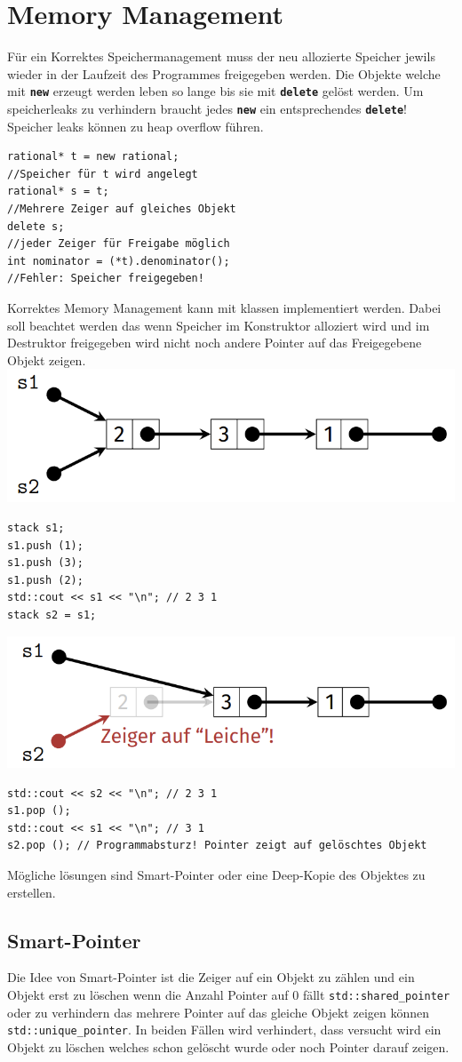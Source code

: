 \section{Memory Management}
Für ein Korrektes Speichermanagement muss der neu allozierte Speicher jewils wieder in der Laufzeit des Programmes freigegeben werden.
Die Objekte welche mit \textbf{\texttt{new}} erzeugt werden leben so lange bis sie mit \textbf{\texttt{delete}} gelöst werden.
Um speicherleaks zu verhindern braucht jedes \textbf{\texttt{new}} ein entsprechendes \textbf{\texttt{delete}}!
Speicher leaks können zu heap overflow führen.
\begin{lstlisting}[mathescape]
rational* t = new rational; 
//Speicher für t wird angelegt
rational* s = t; 
//Mehrere Zeiger auf gleiches Objekt
delete s; 
//jeder Zeiger für Freigabe möglich
int nominator = (*t).denominator(); 
//Fehler: Speicher freigegeben!
\end{lstlisting}
Korrektes Memory Management kann mit klassen implementiert werden. 
Dabei soll beachtet werden das wenn Speicher im Konstruktor alloziert wird und im Destruktor freigegeben wird nicht noch andere Pointer auf das Freigegebene Objekt zeigen.
\includegraphics[width=0.24 \textwidth]{images/stack}
\begin{lstlisting}[mathescape]
stack s1;
s1.push (1);
s1.push (3);
s1.push (2);
std::cout << s1 << "\n"; // 2 3 1
stack s2 = s1;
\end{lstlisting}
\includegraphics[width=0.24 \textwidth]{images/stack2}
\begin{lstlisting}[mathescape]
std::cout << s2 << "\n"; // 2 3 1
s1.pop ();
std::cout << s1 << "\n"; // 3 1
s2.pop (); // Programmabsturz! Pointer zeigt auf gelöschtes Objekt
\end{lstlisting}
Mögliche lösungen sind Smart-Pointer oder eine Deep-Kopie des Objektes zu erstellen.
\subsection{Smart-Pointer}
Die Idee von Smart-Pointer ist die Zeiger auf ein Objekt zu zählen und ein Objekt erst zu löschen wenn die Anzahl Pointer auf 0 fällt
\texttt{std::shared\_pointer} oder zu verhindern das mehrere Pointer auf das gleiche Objekt zeigen können \texttt{std::unique\_pointer}.
In beiden Fällen wird verhindert, dass versucht wird ein Objekt zu löschen welches schon gelöscht wurde oder noch Pointer darauf zeigen.



